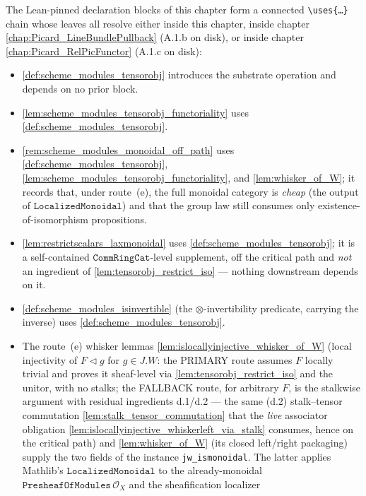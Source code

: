 The Lean-pinned declaration blocks of this chapter form a connected
\texttt{\textbackslash uses\{\dots\}} chain whose leaves all resolve
either inside this chapter, inside chapter
\cref{chap:Picard_LineBundlePullback} (A.1.b on disk), or inside
chapter \cref{chap:Picard_RelPicFunctor} (A.1.c on disk):
\begin{itemize}
  \item \cref{def:scheme_modules_tensorobj} introduces the substrate
    operation and depends on no prior block.
  \item \cref{lem:scheme_modules_tensorobj_functoriality} uses
    \cref{def:scheme_modules_tensorobj}.
  \item \cref{rem:scheme_modules_monoidal_off_path} uses
    \cref{def:scheme_modules_tensorobj},
    \cref{lem:scheme_modules_tensorobj_functoriality}, and \cref{lem:whisker_of_W}; it
    records that, under route~(e), the full monoidal category is \emph{cheap}
    (the output of \(\mathtt{LocalizedMonoidal}\)) and that the group law still
    consumes only existence-of-isomorphism propositions.
  \item \cref{lem:restrictscalars_laxmonoidal} uses
    \cref{def:scheme_modules_tensorobj}; it is a self-contained
    \(\mathtt{CommRingCat}\)-level supplement, off the critical path and
    \emph{not} an ingredient of \cref{lem:tensorobj_restrict_iso} --- nothing
    downstream depends on it.
  \item \cref{def:scheme_modules_isinvertible} (the \(\otimes\)-invertibility
    predicate, carrying the inverse) uses \cref{def:scheme_modules_tensorobj}.
  \item The route~(e) whisker lemmas
    \cref{lem:islocallyinjective_whisker_of_W} (local injectivity of
    \(F \triangleleft g\) for \(g \in J.W\): the PRIMARY route assumes \(F\) locally
    trivial and proves it sheaf-level via \cref{lem:tensorobj_restrict_iso} and the
    unitor, with no stalks; the FALLBACK route, for arbitrary \(F\), is the
    stalkwise argument with residual ingredients d.1/d.2 --- the same (d.2)
    stalk--tensor commutation \cref{lem:stalk_tensor_commutation} that the \emph{live}
    associator obligation \cref{lem:islocallyinjective_whiskerleft_via_stalk} consumes,
    hence on the critical path) and
    \cref{lem:whisker_of_W} (its closed left/right packaging) supply the two
    fields of the instance \texttt{jw\_ismonoidal}. The latter applies Mathlib's
    \(\mathtt{LocalizedMonoidal}\) to the already-monoidal
    \(\mathtt{PresheafOfModules}\,\mathcal{O}_X\) and the sheafification localizer

\end{itemize}
